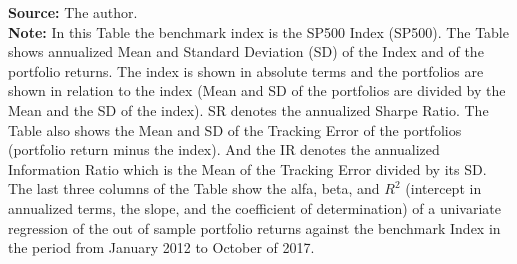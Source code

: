 \documentclass[12pt,oneside,a4paper]{memoir}
\begin{document}
\begin{table}[!ht]
\begin{threeparttable}
\begin{tablenotes} 
\textbf{Source:} The author. \\
\textbf{Note:}
In this Table the benchmark index is the SP500 Index (SP500).
The Table shows annualized Mean and Standard Deviation (SD) of the Index and of the portfolio returns.
The index is shown in absolute terms and the portfolios are shown in relation to the index (Mean and SD of the portfolios are divided by the Mean and the SD of the index).
SR denotes the annualized Sharpe Ratio.
The Table also shows the Mean and SD of the Tracking Error of the portfolios (portfolio return minus the index).
And the IR denotes the annualized Information Ratio which is the Mean of the Tracking Error divided by its SD.
The last three columns of the Table show the alfa, beta, and $R^2$ (intercept in annualized terms, the slope, and the coefficient of determination) of a univariate regression of the out of sample portfolio returns against the benchmark Index in the period from January 2012 to October of 2017.
\end{tablenotes} 

\end{threeparttable}
\end{table} 

\clearpage
\end{document}
